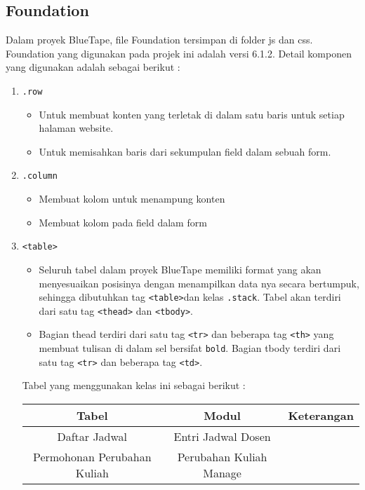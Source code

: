 \subsection{Foundation}
Dalam proyek BlueTape, file Foundation tersimpan di folder js dan css. Foundation yang digunakan pada projek ini adalah versi 6.1.2. Detail komponen yang digunakan adalah sebagai berikut :
\begin{enumerate}
	\item \colorbox{mygray}{\texttt{.row}}
	\begin{itemize}
		\item Untuk membuat konten yang terletak di dalam satu baris untuk setiap halaman website.
		\item Untuk memisahkan baris dari sekumpulan field dalam sebuah form.
	\end{itemize}
	\item \colorbox{mygray}{\texttt{.column}}
	\begin{itemize}
		\item Membuat kolom untuk menampung konten
		\item Membuat kolom pada field dalam form
	\end{itemize}	
	\item \colorbox{mygray}{\texttt{<table>}}  \par
	\begin{itemize}
		\item 	Seluruh tabel dalam proyek BlueTape memiliki format yang akan menyesuaikan posisinya dengan menampilkan data nya secara bertumpuk, sehingga dibutuhkan tag \colorbox{mygray}{\texttt{<table>}}dan kelas \colorbox{mygray}{\texttt{.stack}}. Tabel akan terdiri dari satu tag \colorbox{mygray}{\texttt{<thead>}} dan \colorbox{mygray}{\texttt{<tbody>}}.
		\item Bagian thead terdiri dari satu tag \colorbox{mygray}{\texttt{<tr>}} dan beberapa tag \colorbox{mygray}{\texttt{<th>}} yang membuat tulisan di dalam sel bersifat \texttt{bold}. Bagian tbody terdiri dari satu tag \colorbox{mygray}{\texttt{<tr>}} dan beberapa tag \colorbox{mygray}{\texttt{<td>}}. 
	\end{itemize}
 	Tabel yang menggunakan kelas ini sebagai berikut :
	\begin{center}
		\begin{tabular}{||c | c | c||} 
			\hline
			Tabel & Modul & Keterangan \\ [0.5ex] 
			\hline\hline
			Daftar Jadwal &  Entri Jadwal Dosen &\\
			\hline
			Permohonan Perubahan Kuliah &  Perubahan Kuliah Manage &\\

\end{tabular}
\end{center}
\end{enumerate}
